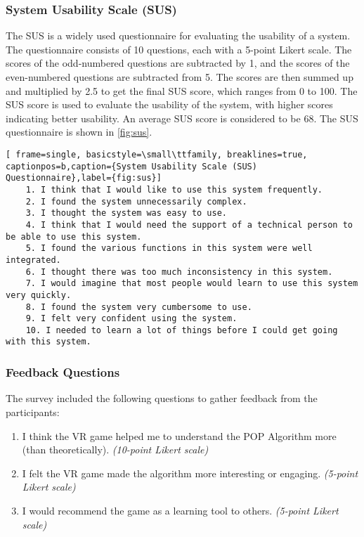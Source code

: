 \subsubsection{System Usability Scale (SUS)}
The \ac{SUS} is a widely used questionnaire for evaluating the usability of a system. The questionnaire consists of 10 questions, each with a 5-point Likert scale. The scores of the odd-numbered questions are subtracted by 1, and the scores of the even-numbered questions are subtracted from 5. The scores are then summed up and multiplied by 2.5 to get the final \ac{SUS} score, which ranges from 0 to 100. The \ac{SUS} score is used to evaluate the usability of the system, with higher scores indicating better usability. An average \ac{SUS} score is considered to be 68\cite{SUSmeasure}. The \ac{SUS} questionnaire is shown in \autoref{fig:sus}.
\begin{lstlisting}[ frame=single, basicstyle=\small\ttfamily, breaklines=true, captionpos=b,caption={System Usability Scale (SUS) Questionnaire},label={fig:sus}]
    1. I think that I would like to use this system frequently.
    2. I found the system unnecessarily complex.
    3. I thought the system was easy to use.
    4. I think that I would need the support of a technical person to be able to use this system.
    5. I found the various functions in this system were well integrated.
    6. I thought there was too much inconsistency in this system.
    7. I would imagine that most people would learn to use this system very quickly.
    8. I found the system very cumbersome to use.
    9. I felt very confident using the system.
    10. I needed to learn a lot of things before I could get going with this system.    
\end{lstlisting}

\subsubsection{Feedback Questions} \label{sec:feedback_questions}
The survey included the following questions to gather feedback from the participants:
\begin{enumerate}
    \item I think the VR game helped me to understand the POP Algorithm more (than theoretically). \textit{(10-point Likert scale)}
    \item I felt the VR game made the algorithm more interesting or engaging. \textit{(5-point Likert scale)}
    \item I would recommend the game as a learning tool to others. \textit{(5-point Likert scale)}
\end{enumerate}






